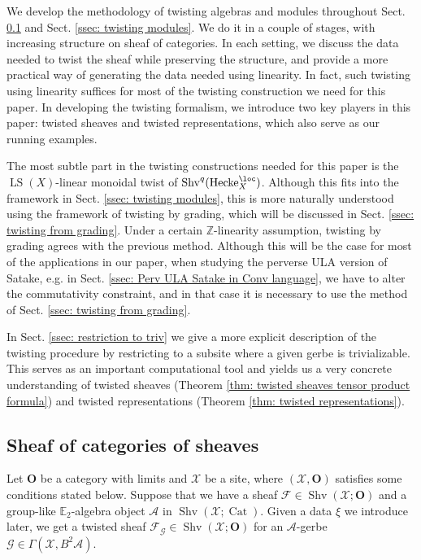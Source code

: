 \documentclass[10pt]{amsart}
\theoremstyle{remark}
\newcommand{\E}{\mathbb{E}}
\newcommand{\Z}{\mathbb{Z}}
\newcommand{\on}{\operatorname}
\newcommand{\cA}{\mathcal{A}}
\newcommand{\cF}{\mathcal{F}}
\newcommand{\cG}{\mathcal{G}}
\newcommand{\cX}{\mathcal{X}}
\newcommand{\Cat}{\on{Cat}}
\newcommand{\Shv}{\on{Shv}}
\newcommand{\LS}{\on{LS}}
\newcommand{\bO}{\mathbf{O}}
\newcommand{\Hecke}{\on{Hecke}}
\begin{document}
We develop the methodology of twisting algebras and modules throughout Sect. \ref{ssec: Yifei construction} and Sect. \ref{ssec: twisting modules}. We do it in a couple of stages, with increasing structure on sheaf of categories. In each setting, we discuss the data needed to twist the sheaf while preserving the structure, and provide a more practical way of generating the data needed using linearity. In fact, such twisting using linearity suffices for most of the twisting construction we need for this paper. In developing the twisting formalism, we introduce two key players in this paper: twisted sheaves and twisted representations, which also serve as our running examples.
\medskip

The most subtle part in the twisting constructions needed for this paper is the $\LS(X)$-linear monoidal twist of $\Shv^q(\Hecke^{\loc}_X)$. Although this fits into the framework in Sect. \ref{ssec: twisting modules}, this is more naturally understood using the framework of twisting by grading, which will be discussed in Sect. \ref{ssec: twisting from grading}. Under a certain $\Z$-linearity assumption, twisting by grading agrees with the previous method. Although this will be the case for most of the applications in our paper, when studying the perverse ULA version of Satake, e.g. in Sect. \ref{ssec: Perv ULA Satake in Conv language}, we have to alter the commutativity constraint, and in that case it is necessary to use the method of Sect. \ref{ssec: twisting from grading}.
\medskip

In Sect. \ref{ssec: restriction to triv} we give a more explicit description of the twisting procedure by restricting to a subsite where a given gerbe is trivializable. This serves as an important computational tool and yields us a very concrete understanding of twisted sheaves (Theorem \ref{thm: twisted sheaves tensor product formula}) and twisted representations (Theorem \ref{thm: twisted representations}). 

\subsection{Sheaf of categories of sheaves}\label{ssec: Yifei construction}
Let $\bO$ be a category with limits and $\cX$ be a site, where $(\cX,\bO)$ satisfies some conditions stated below.
Suppose that we have a sheaf $\cF\in \Shv(\cX;\bO)$ and a group-like $\E_2$-algebra object $\cA$ in $\Shv(\cX;\Cat)$. Given a data $\xi$ we introduce later, we get a twisted sheaf $\cF_{\cG}\in \Shv(\cX;\bO)$ for an $\cA$-gerbe $\cG\in \Gamma(\cX,B^2 \cA)$.
\end{document}
